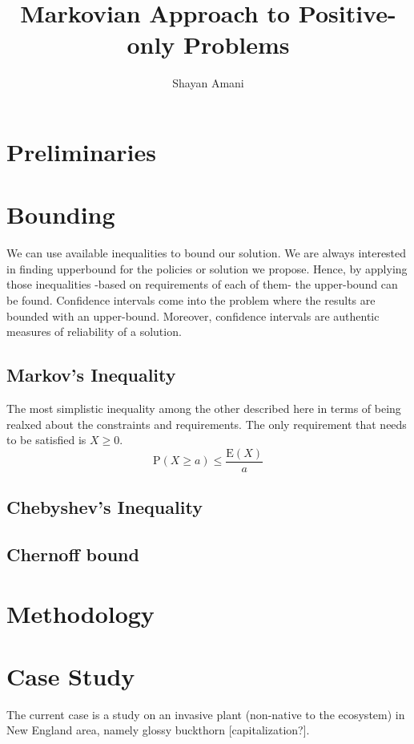 \documentclass[a4paper,12pt]{article}
\title{Markovian Approach to Positive-only Problems}
\author{Shayan Amani}
\begin{document}
\maketitle

\section{Preliminaries}

\section{Bounding}
We can use available inequalities to bound our solution. We are always interested in finding upperbound for the policies or solution we propose. Hence, by applying those inequalities -based on requirements of each of them- the upper-bound can be found. Confidence intervals come into the problem where the results are bounded with an upper-bound. Moreover, confidence intervals are authentic measures of reliability of a solution.

    \subsection{Markov's Inequality}
The most simplistic inequality among the other described here in terms of being realxed about the constraints and requirements. The only requirement that needs to be satisfied is $X \geq 0$.
\begin{equation}
\mathrm {P}(X \geq a ) \leq \frac { \mathrm { E}( X ) } { a }
\end{equation}

    \subsection{Chebyshev's Inequality}
    \subsection{Chernoff bound}


\section{Methodology}


\section{Case Study}
The current case is a study on an invasive plant (non-native to the ecosystem) in New England area, namely glossy buckthorn [capitalization?].
\end{document}
